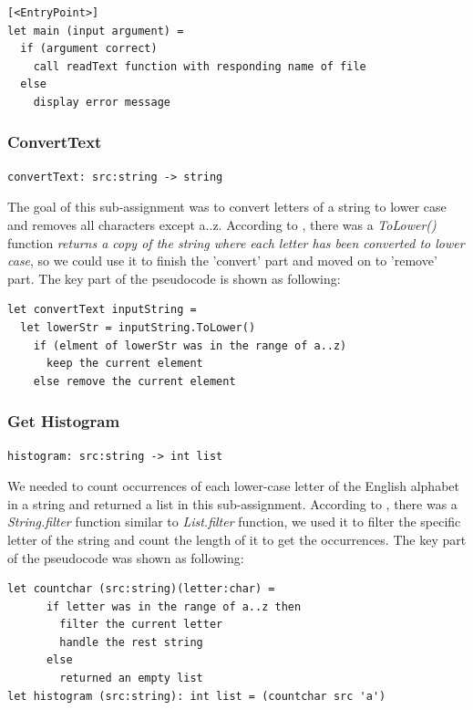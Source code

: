 \documentclass{article}
\begin{document}
\begin{lstlisting}
[<EntryPoint>]
let main (input argument) = 
  if (argument correct)
    call readText function with responding name of file    
  else
    display error message
\end{lstlisting}

\subsubsection{ConvertText}
\begin{lstlisting}
convertText: src:string -> string
\end{lstlisting}

The goal of this sub-assignment was to convert letters of a string to lower case and removes all characters except a..z. 
According to \cite{sporring2019}, there was a \emph{ToLower()} function \emph{returns a copy of the string where each letter has been converted to lower case}, so we could use it to finish the 'convert' part and moved on to 'remove' part. The key part of the pseudocode is shown as following:

\begin{lstlisting}
let convertText inputString = 
  let lowerStr = inputString.ToLower()
    if (elment of lowerStr was in the range of a..z)
      keep the current element
    else remove the current element  
\end{lstlisting}

\subsubsection{Get Histogram}
\begin{lstlisting}
histogram: src:string -> int list
\end{lstlisting}

We needed to count occurrences of each lower-case letter of the English alphabet in a string and returned a list in this sub-assignment. According to \cite{sporring2019}, there was a \emph{String.filter} function similar to \emph{List.filter} function, we used it to filter the specific letter of the string and count the length of it to get the occurrences. The key part of the pseudocode was shown as following:

\begin{lstlisting}
let countchar (src:string)(letter:char) = 
      if letter was in the range of a..z then 
        filter the current letter
        handle the rest string
      else
        returned an empty list
let histogram (src:string): int list = (countchar src 'a')
\end{lstlisting}
\end{document}
